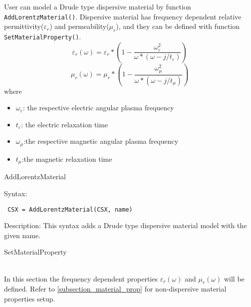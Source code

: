 User can model a Drude type dispersive material by function \texttt{AddLorentzMaterial()}. Dispersive material has frequency dependent relative permittivity($\varepsilon_{r}$) and permeability($\mu_{r}$), and they can be defined with function \texttt{ SetMaterialProperty()}.
\begin{equation}
\varepsilon_{r}(\omega)=\varepsilon_{r}*(1-\dfrac{\omega_{\varepsilon}^2}{\omega*(\omega-j/t_{\varepsilon})})
\end{equation}
\begin{equation}
\mu_{r}(\omega)=\mu_{r}*(1-\dfrac{\omega_{\mu}^2}{\omega*(\omega-j/t_{\mu})})
\end{equation}
where \begin{myindentpar}
\begin{itemize}
\item $\omega_{\varepsilon}$: the respective electric angular plasma frequency
\item $t_{\varepsilon}$: the electric relaxation time 
\item $\omega_{\mu}$:the respective magnetic angular plasma frequency
\item $t_{\mu}$:the magnetic relaxation time
\end{itemize}
\end{myindentpar}

\begin{FontNameFunct}{AddLorentzMaterial}
\end{FontNameFunct}

\begin{FontDescr}{Syntax:}
  \begin{lstlisting}
 CSX = AddLorentzMaterial(CSX, name)
  \end{lstlisting}
\end{FontDescr}

\begin{FontDescr}{Description:}
  This syntax adds a Drude type dispersive material model with the given name.\\ 
\end{FontDescr} 
  

\begin{FontNameFunct}{SetMaterialProperty}  
\end{FontNameFunct}\\
In this section the frequency dependent properties $\varepsilon_{r}(\omega)$ and $\mu_{r}(\omega)$ will be defined. Refer to \ref{subsection_material_prop} for non-dispersive material properties setup. 


